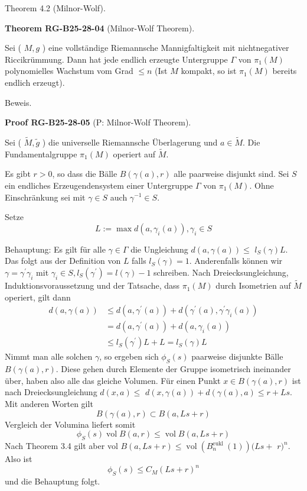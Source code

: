 \documentclass[10pt, letterpaper]{article}
\newcommand{\CustomHeading}[3]{%
  \par\medskip\noindent%
  \textbf{#1 #2} \textnormal{(#3)}.\enskip%
}
\newenvironment{THEO}[2]{\begin{unitbox}\CustomHeading{Theorem}{#1}{#2}}{\end{unitbox}}
\newenvironment{PROOF}[2]{\begin{unitbox}\CustomHeading{Proof}{#1}{#2}}{\end{unitbox}}
\begin{document}
Theorem 4.2 (Milnor-Wolf). 


\begin{THEO}{RG-B25-28-04}{Milnor-Wolf Theorem}
Sei ( $M, g$ ) eine vollständige Riemannsche Mannigfaltigkeit mit nichtnegativer Riccikrümmung. Dann hat jede endlich erzeugte Untergruppe $\Gamma$ von $\pi_{1}(M)$ polynomielles Wachstum vom Grad $\leq n$ (Ist $M$ kompakt, so ist $\pi_{1}(M)$ bereits endlich erzeugt).
\end{THEO}


Beweis. 


\begin{PROOF}{RG-B25-28-05}{P: Milnor-Wolf Theorem}
Sei ( $\tilde{M}, \tilde{g}$ ) die universelle Riemannsche Überlagerung und $a \in \tilde{M}$. Die Fundamentalgruppe $\pi_{1}(M)$ operiert auf $\tilde{M}$.

Es gibt $r>0$, so dass die Bälle $B(\gamma(a), r)$ alle paarweise disjunkt sind. Sei $S$ ein endliches Erzeugendensystem einer Untergruppe $\Gamma$ von $\pi_{1}(M)$. Ohne Einschränkung sei mit $\gamma \in S$ auch $\gamma^{-1} \in S$.

Setze
$$
L:=\max d\left(a, \gamma_{i}(a)\right), \gamma_{i} \in S
$$

Behauptung: Es gilt für alle $\gamma \in \Gamma$ die Ungleichung $d(a, \gamma(a)) \leq$ $l_{S}(\gamma) L$. Das folgt aus der Definition von $L$ falls $l_{S}(\gamma)=1$. Anderenfalls können wir $\gamma=\gamma^{\prime} \gamma_{i}$ mit $\gamma_{i} \in S, l_{S}\left(\gamma^{\prime}\right)=l(\gamma)-1$ schreiben. Nach Dreiecksungleichung, Induktionsvoraussetzung und der Tatsache, dass $\pi_{1}(M)$ durch Isometrien auf $\tilde{M}$ operiert, gilt dann
$$
\begin{aligned}
d(a, \gamma(a)) & \leq d\left(a, \gamma^{\prime}(a)\right)+d\left(\gamma^{\prime}(a), \gamma^{\prime} \gamma_{i}(a)\right) \\
& =d\left(a, \gamma^{\prime}(a)\right)+d\left(a, \gamma_{i}(a)\right) \\
& \leq l_{S}\left(\gamma^{\prime}\right) L+L=l_{S}(\gamma) L
\end{aligned}
$$
Nimmt man alle solchen $\gamma$, so ergeben sich $\phi_{S}(s)$ paarweise disjunkte Bälle $B(\gamma(a), r)$. Diese gehen durch Elemente der Gruppe isometrisch ineinander über, haben also alle das gleiche Volumen. Für einen Punkt $x \in B(\gamma(a), r)$ ist nach Dreiecksungleichung $d(x, a) \leq$ $d(x, \gamma(a))+d(\gamma(a), a) \leq r+L s$. Mit anderen Worten gilt
$$
B(\gamma(a), r) \subset B(a, L s+r)
$$
Vergleich der Volumina liefert somit
$$
\phi_{S}(s) \operatorname{vol} B(a, r) \leq \operatorname{vol} B(a, L s+r)
$$
Nach Theorem 3.4 gilt aber vol $B(a, L s+r) \leq \operatorname{vol}\left(B_{n}^{\text {eukl }}(1)\right)(L s+$ $r)^{n}$. Also ist
$$
\phi_{S}(s) \leq C_{M}(L s+r)^{n}
$$ und die Behauptung folgt.
\end{PROOF}
\end{document}
